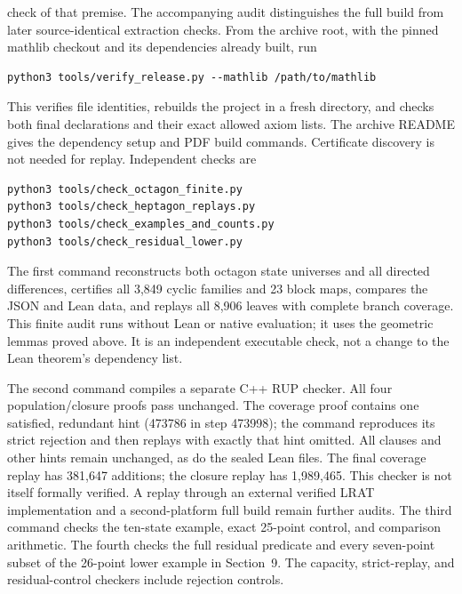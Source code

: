 check of that premise.
The accompanying audit distinguishes the full build from later
source-identical extraction checks. From the archive root, with the pinned
mathlib checkout and its dependencies already built, run
\begin{verbatim}
python3 tools/verify_release.py --mathlib /path/to/mathlib
\end{verbatim}
This verifies file identities, rebuilds the project in a fresh directory,
and checks both final declarations and their exact allowed axiom lists.
The archive README gives the dependency setup and PDF build commands.
Certificate discovery is not needed for replay. Independent checks are
\begin{verbatim}
python3 tools/check_octagon_finite.py
python3 tools/check_heptagon_replays.py
python3 tools/check_examples_and_counts.py
python3 tools/check_residual_lower.py
\end{verbatim}
The first command reconstructs both octagon state universes and all
directed differences, certifies all 3,849 cyclic families and 23 block
maps, compares the JSON and Lean data, and replays all 8,906 leaves
with complete branch coverage. This finite audit runs without Lean or
native evaluation; it uses the geometric lemmas proved above. It is
an independent executable check, not a change to the Lean theorem's
dependency list.

The second command compiles a separate C++ RUP checker. All four
population/closure proofs pass unchanged. The coverage proof contains
one satisfied, redundant hint (473786 in step 473998); the command
reproduces its strict rejection and then replays with exactly that
hint omitted. All clauses and other hints remain unchanged, as do the
sealed Lean files. The final coverage replay has 381,647 additions;
the closure replay has 1,989,465. This checker is not itself formally
verified. A replay through an external verified LRAT implementation
and a second-platform full build remain further audits.
The third command checks the ten-state example, exact 25-point control,
and comparison arithmetic. The fourth checks the full residual predicate
and every seven-point subset of the 26-point lower example in Section~9.
The capacity, strict-replay, and residual-control checkers include rejection controls.

